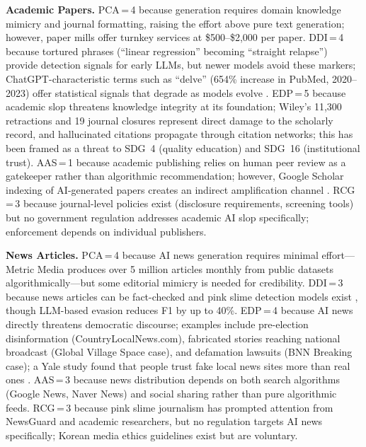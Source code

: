 \documentclass[12pt,a4paper]{article}
\begin{document}
\textbf{Academic Papers.} PCA\,=\,4 because generation requires domain knowledge mimicry and journal formatting, raising the effort above pure text generation; however, paper mills offer turnkey services at \$500--\$2,000 per paper. DDI\,=\,4 because tortured phrases (``linear regression'' becoming ``straight relapse'') provide detection signals for early LLMs, but newer models avoid these markers; ChatGPT-characteristic terms such as ``delve'' (654\% increase in PubMed, 2020--2023) offer statistical signals that degrade as models evolve \parencite{SciAm2026}. EDP\,=\,5 because academic slop threatens knowledge integrity at its foundation; Wiley's 11,300 retractions and 19 journal closures represent direct damage to the scholarly record, and hallucinated citations propagate through citation networks; this has been framed as a threat to SDG~4 (quality education) and SDG~16 (institutional trust). AAS\,=\,1 because academic publishing relies on human peer review as a gatekeeper rather than algorithmic recommendation; however, Google Scholar indexing of AI-generated papers creates an indirect amplification channel \parencite{WaltersWilder2024}. RCG\,=\,3 because journal-level policies exist (disclosure requirements, screening tools) but no government regulation addresses academic AI slop specifically; enforcement depends on individual publishers.

\textbf{News Articles.} PCA\,=\,4 because AI news generation requires minimal effort---Metric Media produces over 5 million articles monthly from public datasets algorithmically---but some editorial mimicry is needed for credibility. DDI\,=\,3 because news articles can be fact-checked and pink slime detection models exist \parencite{Gruppi2025}, though LLM-based evasion reduces F1 by up to 40\%. EDP\,=\,4 because AI news directly threatens democratic discourse; examples include pre-election disinformation (CountryLocalNews.com), fabricated stories reaching national broadcast (Global Village Space case), and defamation lawsuits (BNN Breaking case); a Yale study found that people trust fake local news sites more than real ones \parencite{YaleISPS2025}. AAS\,=\,3 because news distribution depends on both search algorithms (Google News, Naver News) and social sharing rather than pure algorithmic feeds. RCG\,=\,3 because pink slime journalism has prompted attention from NewsGuard and academic researchers, but no regulation targets AI news specifically; Korean media ethics guidelines exist but are voluntary.
\end{document}
